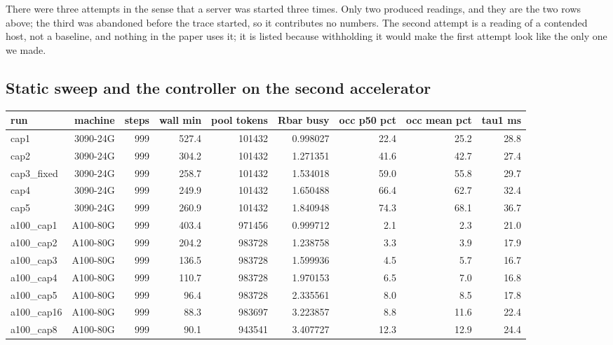 \documentclass[10pt]{article}
\begin{document}
There were three attempts in the sense that a server was started three times.
Only two produced readings, and they are the two rows above; the third was
abandoned before the trace started, so it contributes no numbers. The second
attempt is a reading of a contended host, not a baseline, and nothing in the
paper uses it; it is listed because withholding it would make the first attempt
look like the only one we made.

\subsection{Static sweep and the controller on the second accelerator}


\begin{landscape}\begin{center}\footnotesize\setlength{\tabcolsep}{3pt}
\begin{tabular}{lrrrrrrrr}
\toprule
run & machine & steps & wall min & pool tokens & Rbar busy & occ p50 pct & occ mean pct & tau1 ms \\
\midrule
cap1 & 3090-24G & 999 & 527.4 & 101432 & 0.998027 & 22.4 & 25.2 & 28.8 \\
cap2 & 3090-24G & 999 & 304.2 & 101432 & 1.271351 & 41.6 & 42.7 & 27.4 \\
cap3\_fixed & 3090-24G & 999 & 258.7 & 101432 & 1.534018 & 59.0 & 55.8 & 29.7 \\
cap4 & 3090-24G & 999 & 249.9 & 101432 & 1.650488 & 66.4 & 62.7 & 32.4 \\
cap5 & 3090-24G & 999 & 260.9 & 101432 & 1.840948 & 74.3 & 68.1 & 36.7 \\
a100\_cap1 & A100-80G & 999 & 403.4 & 971456 & 0.999712 & 2.1 & 2.3 & 21.0 \\
a100\_cap2 & A100-80G & 999 & 204.2 & 983728 & 1.238758 & 3.3 & 3.9 & 17.9 \\
a100\_cap3 & A100-80G & 999 & 136.5 & 983728 & 1.599936 & 4.5 & 5.7 & 16.7 \\
a100\_cap4 & A100-80G & 999 & 110.7 & 983728 & 1.970153 & 6.5 & 7.0 & 16.8 \\
a100\_cap5 & A100-80G & 999 & 96.4 & 983728 & 2.335561 & 8.0 & 8.5 & 17.8 \\
a100\_cap16 & A100-80G & 999 & 88.3 & 983697 & 3.223857 & 8.8 & 11.6 & 22.4 \\
a100\_cap8 & A100-80G & 999 & 90.1 & 943541 & 3.407727 & 12.3 & 12.9 & 24.4 \\
\bottomrule
\end{tabular}\end{center}\end{landscape}
\end{document}
